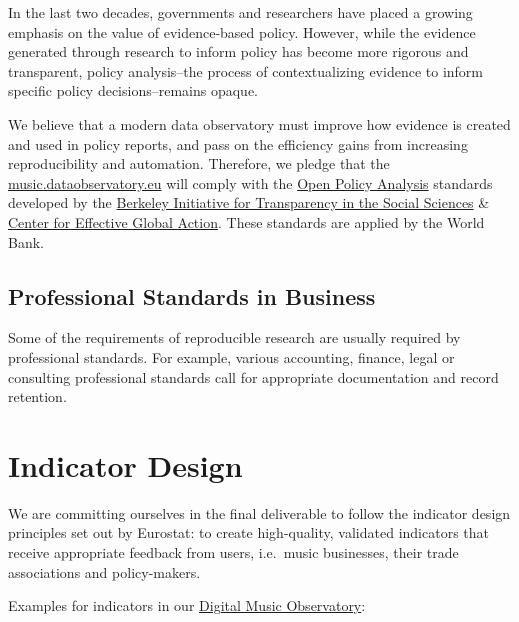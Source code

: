 \documentclass[
  a4paper,
  openany, a4paper, oneside]{book}
\begin{document}
In the last two decades, governments and researchers have placed a growing emphasis on the value of evidence-based policy. However, while the evidence generated through research to inform policy has become more rigorous and transparent, policy analysis--the process of contextualizing evidence to inform specific policy decisions--remains opaque.

We believe that a modern data observatory must improve how evidence is created and used in policy reports, and pass on the efficiency gains from increasing reproducibility and automation. Therefore, we pledge that the \href{https://music.dataobservatory.eu}{music.dataobservatory.eu} will comply with the \href{https://www.bitss.org/opa/}{Open Policy Analysis} standards developed by the \href{https://www.bitss.org/}{Berkeley Initiative for Transparency in the Social Sciences} \& \href{https://cega.berkeley.edu/}{Center for Effective Global Action}. These standards are applied by the World Bank.

\hypertarget{business-professional-standards}{%
\subsection{Professional Standards in Business}\label{business-professional-standards}}

Some of the requirements of reproducible research are usually required by professional standards. For example, various accounting, finance, legal or consulting professional standards call for appropriate documentation and record retention.

\hypertarget{indicator-design}{%
\section{Indicator Design}\label{indicator-design}}

We are committing ourselves in the final deliverable to follow the indicator design principles set out by Eurostat:
\citep{eurostat_harmonised_indicators_2014, kotzeva_harmonised_indicators_2017, eurostat_harmonised_indicators_2014} to create high-quality, validated indicators that receive appropriate feedback from users, i.e.~music businesses, their trade associations and policy-makers.

Examples for indicators in our \href{https://music.dataobservatory.eu/}{Digital Music Observatory}:
\end{document}
